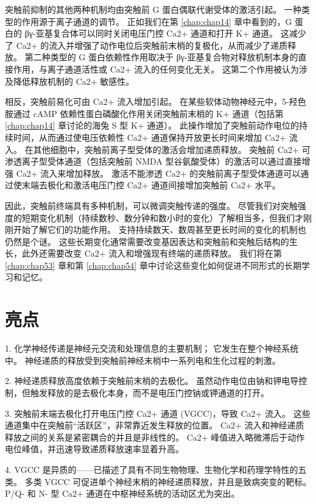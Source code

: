突触前抑制的其他两种机制均由突触前 G 蛋白偶联代谢受体的激活引起。 
一种类型的作用源于离子通道的调节。 
正如我们在第 \ref{chap:chap14} 章中看到的，G 蛋白的 βγ-亚基复合体可以同时关闭电压门控 Ca2+ 通道和打开 K+ 通道。 这减少了 Ca2+ 的流入并增强了动作电位后突触前末梢的复极化，从而减少了递质释放。 
第二种类型的 G 蛋白依赖性作用取决于 βγ-亚基复合物对释放机制本身的直接作用，与离子通道活性或 Ca2+ 流入的任何变化无关。 
这第二个作用被认为涉及降低释放机制的 Ca2+ 敏感性。


相反，突触前易化可由 Ca2+ 流入增加引起。 
在某些软体动物神经元中，5-羟色胺通过 cAMP 依赖性蛋白磷酸化作用关闭突触前末梢的 K+ 通道（包括第 \ref{chap:chap14} 章讨论的海兔 S 型 K+ 通道）。 
此操作增加了突触前动作电位的持续时间，从而通过使电压依赖性 Ca2+ 通道保持开放更长时间来增加 Ca2+ 流入。 在其他细胞中，突触前离子型受体的激活会增加递质释放。 
突触前 Ca2+ 可渗透离子型受体通道（包括突触前 NMDA 型谷氨酸受体）的激活可以通过直接增强 Ca2+ 流入来增加释放。 
激活不能渗透 Ca2+ 的突触前离子型受体通道可以通过使末端去极化和激活电压门控 Ca2+ 通道间接增加突触前 Ca2+ 水平。


因此，突触前终端具有多种机制，可以微调突触传递的强度。 
尽管我们对突触强度的短期变化机制（持续数秒、数分钟和数小时的变化）了解相当多，但我们才刚刚开始了解它们的功能作用。 
支持持续数天、数周甚至更长时间的变化的机制也仍然是个谜。 
这些长期变化通常需要改变基因表达和突触前和突触后结构的生长，此外还需要改变 Ca2+ 流入和增强现有终端的递质释放。 
我们将在第 \ref{chap:chap53} 章和第 \ref{chap:chap54} 章中讨论这些变化如何促进不同形式的长期学习和记忆。



\section{亮点}

1. 化学神经传递是神经元交流和处理信息的主要机制； 它发生在整个神经系统中。 
神经递质的释放受到突触前神经末梢中一系列电和生化过程的刺激。 


2. 神经递质释放高度依赖于突触前末梢的去极化。 
虽然动作电位由钠和钾电导控制，但触发释放的是去极化本身，而不是电压门控钠或钾通道的打开。 


3. 突触前末端去极化打开电压门控 Ca2+ 通道 (VGCC)，导致 Ca2+ 流入。 
这些通道集中在突触前“活跃区”，非常靠近发生释放的位置。 
Ca2+ 流入和神经递质释放之间的关系是紧密耦合的并且是非线性的。 
Ca2+ 峰值进入略微滞后于动作电位峰值，并迅速导致递质释放速率显着升高。 


4. VGCC 是异质的——已描述了具有不同生物物理、生物化学和药理学特性的五类。 
多类 VGCC 可促进单个神经末梢的神经递质释放，并且是致病突变的靶标。 
P/Q- 和 N- 型 Ca2+ 通道在中枢神经系统的活动区尤为突出。 


